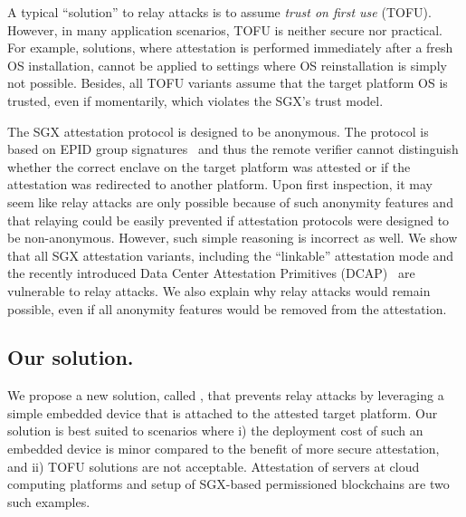 A typical ``solution'' to relay attacks is to assume \emph{trust on first use} (TOFU). However, in many application scenarios, TOFU is neither secure nor practical. For example, solutions, where attestation is performed immediately after a fresh OS installation, cannot be applied to settings where OS reinstallation is simply not possible. Besides, all TOFU variants assume that the target platform OS is trusted, even if momentarily, which violates the SGX's trust model. %



The SGX attestation protocol is designed to be anonymous. The protocol is based on EPID group signatures~\cite{epid_attestation} and thus the remote verifier cannot distinguish whether the correct enclave on the target platform was attested or if the attestation was redirected to another platform. Upon first inspection, it may seem like relay attacks are only possible because of such anonymity features and that relaying could be easily prevented if attestation protocols were designed to be non-anonymous. However, such simple reasoning is incorrect as well. 
%
We show that all SGX attestation variants, including the ``linkable'' attestation mode and the recently introduced Data Center Attestation Primitives (DCAP)~\cite{DCAP} are vulnerable to relay attacks. We also explain why relay attacks would remain possible, even if all anonymity features would be removed from the attestation.


\subsection{Our solution.} We propose a new solution, called \name, that prevents relay attacks by leveraging a simple embedded device that is attached to the attested target platform. Our solution is best suited to scenarios where i) the deployment cost of such an embedded device is minor compared to the benefit of more secure attestation, and ii) TOFU solutions are not acceptable. Attestation of servers at cloud computing platforms and setup of SGX-based permissioned blockchains are two such examples. 


